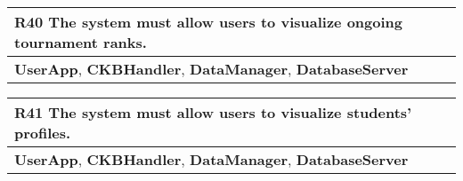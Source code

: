 \begin{table}[H]
    \begin{tabularx}{\textwidth}{X}
        \toprule
        \textbf{R40} The system must allow users to visualize ongoing tournament ranks. \\ \midrule
        \textbf{UserApp}, \textbf{CKBHandler}, \textbf{DataManager}, \textbf{DatabaseServer}                      \\
    \end{tabularx}
\end{table}

\begin{table}[H]
    \begin{tabularx}{\textwidth}{X}
        \toprule
        \textbf{R41} The system must allow users to visualize students' profiles.  \\ \midrule
        \textbf{UserApp}, \textbf{CKBHandler}, \textbf{DataManager}, \textbf{DatabaseServer}                    \\
    \end{tabularx}
\end{table}